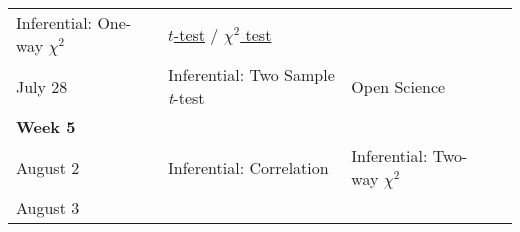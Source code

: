 \documentclass[
]{book}
\begin{document}
\begin{longtable}[]{@{}llll@{}}
\begin{minipage}[t]{0.29\columnwidth}
Inferential: One-way \(\chi^2\)\strut
\end{minipage} & \begin{minipage}[t]{0.18\columnwidth}\raggedright
\href{https://learningstatisticswithr.com/book/ttest.html}{\(t\)-test} / \href{https://learningstatisticswithr.com/book/chisquare.html}{\(\chi^2\) test}\strut
\end{minipage}\tabularnewline
\begin{minipage}[t]{0.09\columnwidth}\raggedright
July 28\strut
\end{minipage} & \begin{minipage}[t]{0.32\columnwidth}\raggedright
Inferential: Two Sample \emph{t}-test\strut
\end{minipage} & \begin{minipage}[t]{0.29\columnwidth}\raggedright
Open Science\strut
\end{minipage} & \begin{minipage}[t]{0.18\columnwidth}\raggedright
\strut
\end{minipage}\tabularnewline
\begin{minipage}[t]{0.09\columnwidth}\raggedright
\textbf{Week 5}\strut
\end{minipage} & \begin{minipage}[t]{0.32\columnwidth}\raggedright
\strut
\end{minipage} & \begin{minipage}[t]{0.29\columnwidth}\raggedright
\strut
\end{minipage} & \begin{minipage}[t]{0.18\columnwidth}\raggedright
\strut
\end{minipage}\tabularnewline
\begin{minipage}[t]{0.09\columnwidth}\raggedright
August 2\strut
\end{minipage} & \begin{minipage}[t]{0.32\columnwidth}\raggedright
Inferential: Correlation\strut
\end{minipage} & \begin{minipage}[t]{0.29\columnwidth}\raggedright
Inferential: Two-way \(\chi^2\)\strut
\end{minipage} & \begin{minipage}[t]{0.18\columnwidth}\raggedright
\strut
\end{minipage}\tabularnewline
\begin{minipage}[t]{0.09\columnwidth}\raggedright
August 3\strut
\end{minipage} & \begin{minipage}[t]{0.32\columnwidth}\raggedright

\end{minipage}
\end{longtable}
\end{document}
